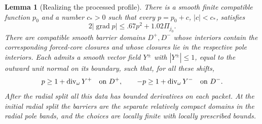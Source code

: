 \documentclass[11pt]{article}
\numberwithin{equation}{section}
\newtheorem{lemma}[theorem]{Lemma}
\theoremstyle{definition}
\theoremstyle{remark}
\begin{document}
\begin{lemma}[Realizing the processed profile]\label{cut:pressure}
There is a smooth finite compatible function $p_0$ and a number $c_*>0$
such that every $p=p_0+c$, $|c|<c_*$, satisfies
\begin{equation}\label{cut:pressure-gradient}
             2|\operatorname{grad} p|\le .67p^2+1.02\Pi_{j_0}.
\end{equation}
There are compatible smooth barrier domains $D^+,D^-$ whose interiors
contain the corresponding forced-core closures and whose closures lie in
the respective pole interiors.  Each admits a smooth vector field $Y^\pm$
with $|Y^\pm|\le1$, equal to the outward unit normal on its boundary, such
that, for all these shifts,
\begin{equation}\label{cut:barrier-pressure}
 p\ge1+\operatorname{div}_\omega Y^+\quad\hbox{on }D^+,
 \qquad
 -p\ge1+\operatorname{div}_\omega Y^-\quad\hbox{on }D^-.
\end{equation}
After the radial split all this data has bounded derivatives on each packet.
At the initial radial split the barriers are the separate relatively
compact domains in the radial pole bands, and the choices are locally
finite with locally prescribed bounds.
\end{lemma}
\end{document}
